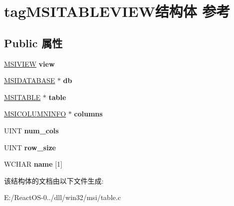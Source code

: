\hypertarget{structtag_m_s_i_t_a_b_l_e_v_i_e_w}{}\section{tag\+M\+S\+I\+T\+A\+B\+L\+E\+V\+I\+E\+W结构体 参考}
\label{structtag_m_s_i_t_a_b_l_e_v_i_e_w}
\subsection*{Public 属性}
\begin{DoxyCompactItemize}
\item 
\mbox{\label{structtag_m_s_i_t_a_b_l_e_v_i_e_w_a933f246824d723ab71edac30c9262826}} 
\hyperlink{structtag_m_s_i_v_i_e_w}{M\+S\+I\+V\+I\+EW} {\bfseries view}
\item 
\mbox{\label{structtag_m_s_i_t_a_b_l_e_v_i_e_w_a85995b999d986c3c8df61cad0b0b39c0}} 
\hyperlink{structtag_m_s_i_d_a_t_a_b_a_s_e}{M\+S\+I\+D\+A\+T\+A\+B\+A\+SE} $\ast$ {\bfseries db}
\item 
\mbox{\label{structtag_m_s_i_t_a_b_l_e_v_i_e_w_a92712d1da734a498e8e6ad5974893a41}} 
\hyperlink{structtag_m_s_i_t_a_b_l_e}{M\+S\+I\+T\+A\+B\+LE} $\ast$ {\bfseries table}
\item 
\mbox{\label{structtag_m_s_i_t_a_b_l_e_v_i_e_w_a831f1e2f482e6e6cd1f66abc7e0d25e4}} 
\hyperlink{structtag_m_s_i_c_o_l_u_m_n_i_n_f_o}{M\+S\+I\+C\+O\+L\+U\+M\+N\+I\+N\+FO} $\ast$ {\bfseries columns}
\item 
\mbox{\label{structtag_m_s_i_t_a_b_l_e_v_i_e_w_ab6fef9bdf0705501b68892b65063c2bc}} 
U\+I\+NT {\bfseries num\+\_\+cols}
\item 
\mbox{\label{structtag_m_s_i_t_a_b_l_e_v_i_e_w_a1b8eb29618bf15f4a10c0145d9653af6}} 
U\+I\+NT {\bfseries row\+\_\+size}
\item 
\mbox{\label{structtag_m_s_i_t_a_b_l_e_v_i_e_w_ad80e321b61150de81f4a6f71f9427c4c}} 
W\+C\+H\+AR {\bfseries name} \mbox{[}1\mbox{]}
\end{DoxyCompactItemize}


该结构体的文档由以下文件生成\+:\begin{DoxyCompactItemize}
\item 
E\+:/\+React\+O\+S-\/0../dll/win32/msi/table.\+c\end{DoxyCompactItemize}
